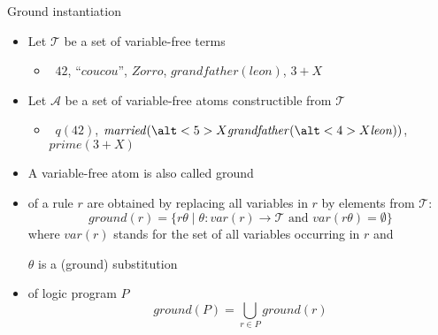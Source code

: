 \begin{frame}{Ground instantiation}

  \begin{itemize}
  \item<2-> Let $\mathcal{T}$ be a set of variable-free \alert<2-3>{terms}
    \smallskip
    \begin{itemize}\normalsize
    \item<only@3-5>  \ $42$, ``$\mathit{cou cou}$'', $\mathit{Zorro}$, $\mathit{grandfather}(\mathit{leon})$, $3+X$
    \end{itemize}
    \smallskip
  \item<2-> Let $\mathcal{A}$ be a set of variable-free \alert<2-3>{atoms} constructible from $\mathcal{T}$
    \smallskip
    \begin{itemize}\normalsize
    \item<only@3-5>  \ $q(42)$, $\mathit{married}(\alt<5>{X}{\mathit{grandfather}(\alt<4>{X}{\mathit{leon}})})$, $\mathit{prime}(3+X)$
    \end{itemize}
    \medskip
  \item<8-> A variable-free atom is also called \alert{ground}
    \medskip
  \item<9->  of a rule $r$ are obtained by
    replacing all variables in $r$ by elements from $\mathcal{T}$:
    \[
    \mathit{ground}(r)=\{r\theta\mid\theta:\mathit{var}(r)\rightarrow \mathcal{T} \text{ and } \mathit{var}(r\theta)=\emptyset\}
    \]
    where $\mathit{var}(r)$ stands for the set of all variables occurring in $r$ and

    $\theta$ is a (ground) substitution
    \medskip
  \item<10->  of logic program $P$
    \[
    \mathit{ground}(P)=\textstyle\bigcup_{r\in P}\mathit{ground}(r)
    \]
  \end{itemize}
\end{frame}
